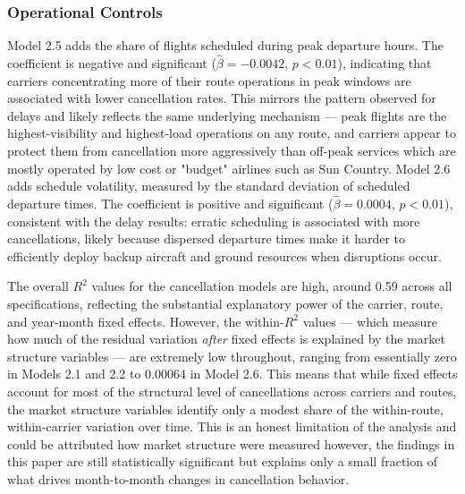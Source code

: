 \documentclass[preprint,12pt,authoryear]{elsarticle}
\begin{document}
\subsubsection{Operational Controls}
Model 2.5 adds the share of flights scheduled during peak departure hours. The coefficient is negative and significant ($\hat{\beta} = -0.0042$, $p < 0.01$), indicating that carriers concentrating more of their route operations in peak windows are associated with lower cancellation rates. This mirrors the pattern observed for delays and likely reflects the same underlying mechanism --- peak flights are the highest-visibility and highest-load operations on any route, and carriers appear to protect them from cancellation more aggressively than off-peak services which are mostly operated by low cost or "budget" airlines such as Sun Country. Model 2.6 adds schedule volatility, measured by the standard deviation of scheduled departure times. The coefficient is positive and significant ($\hat{\beta} = 0.0004$, $p < 0.01$), consistent with the delay results: erratic scheduling is associated with more cancellations, likely because dispersed departure times make it harder to efficiently deploy backup aircraft and ground resources when disruptions occur.

The overall $R^{2}$ values for the cancellation models are high, around 0.59 across all specifications, reflecting the substantial explanatory power of the carrier, route, and year-month fixed effects. However, the within-$R^{2}$ values — which measure how much of the residual variation \emph{after} fixed effects is explained by the market structure variables — are extremely low throughout, ranging from essentially zero in Models 2.1 and 2.2 to 0.00064 in Model 2.6. This means that while fixed effects account for most of the structural level of cancellations across carriers and routes, the market structure variables identify only a modest share of the within-route, within-carrier variation over time. This is an honest limitation of the analysis and could be attributed how market structure were measured however, the findings in this paper are still statistically significant but explains only a small fraction of what drives month-to-month changes in cancellation behavior.
\end{document}
